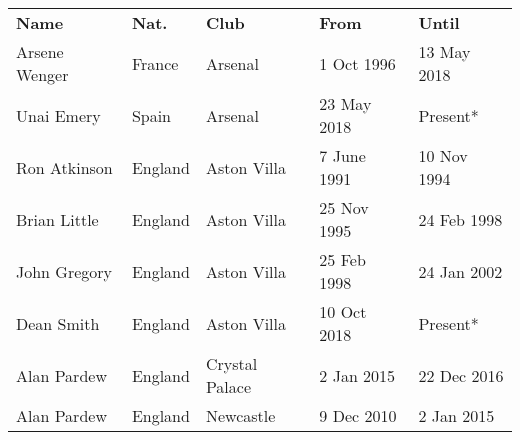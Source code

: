 \begin{tabular}{lllll}
 \textbf{Name} & \textbf{Nat.} & \textbf{Club} & \textbf{From} & \textbf{Until} \\
  Arsene Wenger & France & Arsenal & 1 Oct 1996 & 13 May 2018 \\
  Unai Emery & Spain & Arsenal & 23 May 2018 & Present* \\
  Ron Atkinson & England & Aston Villa & 7 June 1991 & 10 Nov 1994\\
  Brian Little & England & Aston Villa & 25 Nov 1995 & 24 Feb 1998 \\
  John Gregory & England & Aston Villa & 25 Feb 1998 & 24 Jan 2002 \\
  Dean Smith & England & Aston Villa & 10 Oct 2018 & Present* \\
  Alan Pardew & England & Crystal Palace & 2 Jan 2015 & 22 Dec 2016 \\
  Alan Pardew & England & Newcastle & 9 Dec 2010 & 2 Jan 2015 \\
\end{tabular}%
